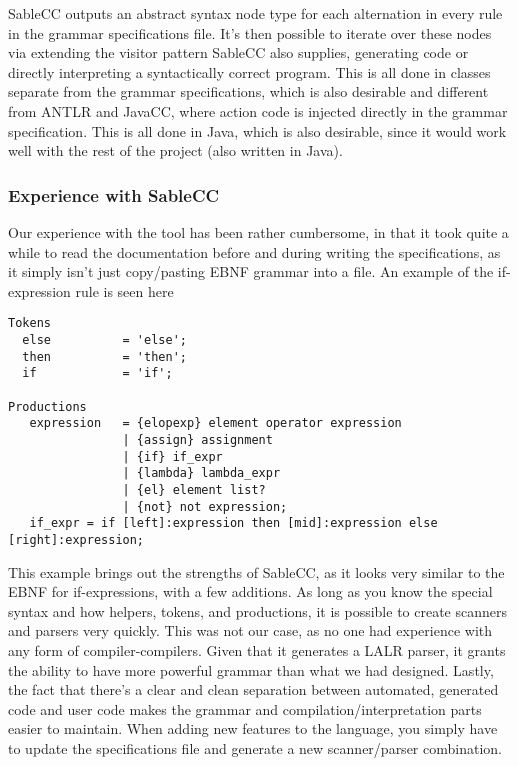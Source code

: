 SableCC outputs an abstract syntax node type for each alternation in
every rule in the grammar specifications file. It's then possible to
iterate over these nodes via extending the visitor pattern SableCC also
supplies, generating code or directly interpreting a syntactically
correct program. This is all done in classes separate from the grammar
specifications, which is also desirable and different from ANTLR
and JavaCC, where action code is injected directly in the grammar
specification. This is all done in Java, which is also desirable, since
it would work well with the rest of the project (also written in Java).

\subsubsection{Experience with SableCC}
Our experience with the tool has been rather cumbersome, in that it took
quite a while to read the documentation before and during writing the
specifications, as it simply isn't just copy/pasting EBNF grammar
into a file. An example of the if-expression rule is seen here

\begin{lstlisting}[caption=Part of the grammar specifications file of SableCC with focus on if-expressions.]
Tokens
  else          = 'else';
  then          = 'then';
  if            = 'if';

Productions
   expression   = {elopexp} element operator expression
                | {assign} assignment
                | {if} if_expr
                | {lambda} lambda_expr
                | {el} element list?
                | {not} not expression;
   if_expr = if [left]:expression then [mid]:expression else [right]:expression;
\end{lstlisting}

This example brings out the strengths of SableCC, as it looks very
similar to the EBNF for if-expressions, with a few additions. As long as
you know the special syntax and how helpers, tokens, and productions, it
is possible to create scanners and parsers very quickly. This was not
our case, as no one had experience with any form of compiler-compilers.
Given that it generates a LALR parser, it grants the ability to have
more powerful grammar than what we had designed. Lastly, the fact that
there's a clear and clean separation between automated, generated code
and user code makes the grammar and compilation/interpretation parts
easier to maintain. When adding new features to the language, you simply
have to update the specifications file and generate a new scanner/parser
combination.

